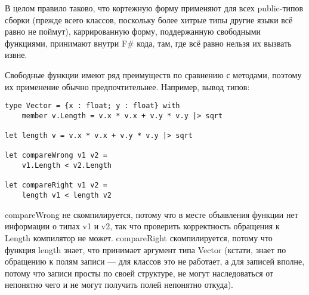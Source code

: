 \documentclass{../../text-style}
\begin{document}
В целом правило таково, что кортежную форму применяют для всех public-типов сборки (прежде всего классов, поскольку более хитрые типы другие языки всё равно не поймут), каррированную форму, поддержанную свободными функциями, принимают внутри F\# кода, там, где всё равно нельзя их вызвать извне.

Свободные функции имеют ряд преимуществ по сравнению с методами, поэтому их применение обычно предпочтительнее.
Например, вывод типов:

\begin{verbatim}
type Vector = {x : float; y : float} with
    member v.Length = v.x * v.x + v.y * v.y |> sqrt
    
let length v = v.x * v.x + v.y * v.y |> sqrt

let compareWrong v1 v2 =
    v1.Length < v2.Length

let compareRight v1 v2 =
    length v1 < length v2
\end{verbatim}

compareWrong не скомпилируется, потому что в месте объявления функции нет информации о типах v1 и v2, так что проверить корректность обращения к Length компилятор не может.
compareRight скомпилируется, потому что функция length знает, что принимает аргумент типа Vector (кстати, знает по обращению к полям записи --- для классов это не работает, а для записей вполне, потому что записи просты по своей структуре, не могут наследоваться от непонятно чего и не могут получить полей непонятно откуда).
\end{document}
